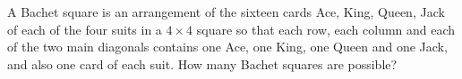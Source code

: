 A Bachet square is an arrangement of the sixteen cards Ace, King, Queen, Jack of each of the four suits in a $4\times4$ square so that each row, each column and each of the two main diagonals contains one Ace, one King, one Queen and one Jack, and also one card of each suit. How many Bachet squares are possible?
